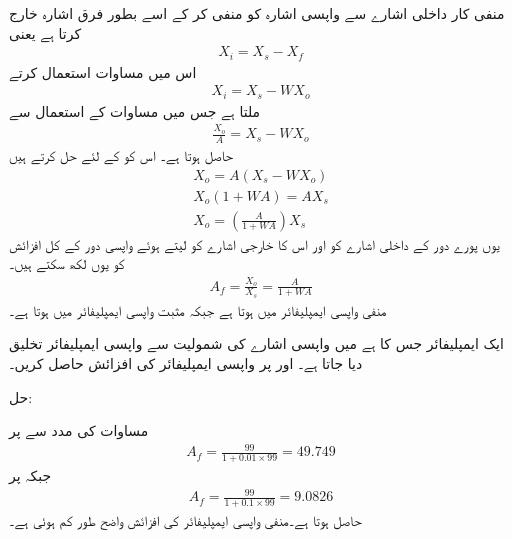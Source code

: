 منفی کار داخلی اشارے  سے واپسی اشارہ  کو منفی کر کے اسے بطور فرق اشارہ  خارج کرتا ہے یعنی
\begin{align} \label{مساوات_واپسی_فرق_اشارہ}
X_i= X_s - X_f
\end{align}
اس میں مساوات  استعمال کرتے
\begin{align} \label{مساوات_واپسی_ایمپلیفائر_کے_جماعت_بندی}
X_i= X_s - W X_o
\end{align}
ملتا ہے جس میں مساوات  کے استعمال سے
\begin{align*}
\frac{X_o}{A} =X_s - W X_o
\end{align*}
حاصل ہوتا ہے۔ اس کو  کے لئے حل کرتے ہیں
\begin{align*}
X_o =A \left( X_s-W X_o \right) \\
X_o \left (1+ W A \right ) =A X_s \\
X_o =\left(\frac{A}{1+ W A}\right) X_s
\end{align*}
یوں پورے دور کے داخلی اشارے  کو  اور اس کا خارجی اشارے کو  لیتے ہوئے واپسی دور کے کل افزائش  کو یوں لکھ سکتے ہیں۔
\begin{align} \label{مساوات_واپسی_کل_افزائش}
A_f =\frac{X_o}{X_s}=\frac{A}{1+ W A}
\end{align}
منفی واپسی ایمپلیفائر میں   ہوتا ہے جبکہ مثبت واپسی ایمپلیفائر میں   ہوتا ہے۔

ایک ایمپلیفائر جس کا   ہے  میں واپسی اشارے کی شمولیت سے واپسی ایمپلیفائر تخلیق دیا جاتا ہے۔ اور  پر  واپسی ایمپلیفائر کی افزائش  حاصل کریں۔ 

حل:

مساوات  کی مدد سے   پر
\begin{align*}
A_f = \frac{99}{1+0.01 \times 99}=\num{49.749}
\end{align*} 
جبکہ   پر
\begin{align*}
A_f = \frac{99}{1+0.1 \times 99}=\num{9.0826}
\end{align*} 
 حاصل ہوتا ہے۔منفی واپسی ایمپلیفائر کی افزائش واضح طور کم ہوئی ہے۔ 

